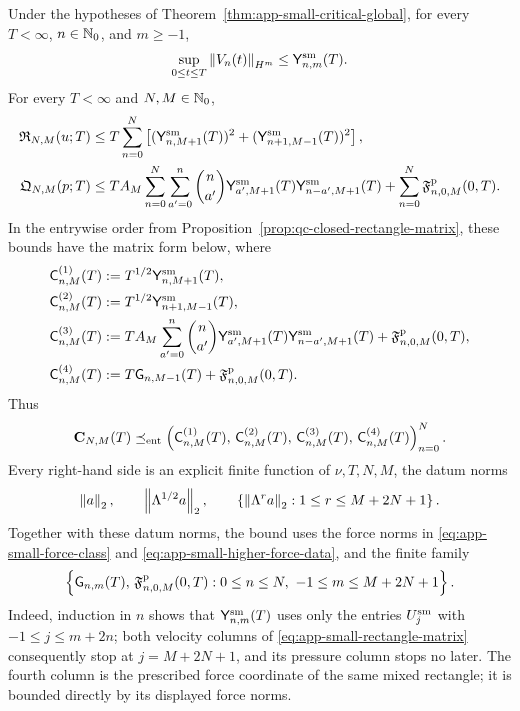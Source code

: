 \begin{proposition}
\label{prop:app-small-data-rectangles}
Under the hypotheses of Theorem~\ref{thm:app-small-critical-global}, for
every \(T<\infty\), \(n\in\mathbb N_0\), and \(m\ge-1\),
\begin{equation}
 \sup_{0\le t\le T}\left\lVert V_n(t)\right\rVert_{H^m}
 \le\mathsf Y_{n,m}^{\rm sm}(T).
 \label{eq:app-small-time-row}
\end{equation}
For every \(T<\infty\) and \(N,M\in\mathbb N_0\),
\begin{align}
 \mathfrak R_{N,M}(u;T)
 &\le
 T\sum_{n=0}^{N}
 \left[
 (\mathsf Y_{n,M+1}^{\rm sm}(T))^2
 +(\mathsf Y_{n+1,M-1}^{\rm sm}(T))^2
 \right],
 \label{eq:app-small-rectangle}\\
 \mathfrak Q_{N,M}(p;T)
 &\le
 TA_M\sum_{n=0}^{N}\sum_{a'=0}^{n}\binom n{a'}
 \mathsf Y_{a',M+1}^{\rm sm}(T)
 \mathsf Y_{n-a',M+1}^{\rm sm}(T)
 +\sum_{n=0}^{N}\mathfrak F^{\rm p}_{n,0,M}(0,T).
 \label{eq:app-small-pressure-rectangle}
\end{align}
In the entrywise order from
Proposition~\ref{prop:qc-closed-rectangle-matrix}, these bounds have the
matrix form below, where
\begin{align*}
 \mathsf C^{(1)}_{n,M}(T)
 &:=T^{1/2}\mathsf Y_{n,M+1}^{\rm sm}(T),\\
 \mathsf C^{(2)}_{n,M}(T)
 &:=T^{1/2}\mathsf Y_{n+1,M-1}^{\rm sm}(T),\\
 \mathsf C^{(3)}_{n,M}(T)
 &:=TA_M\sum_{a'=0}^{n}\binom n{a'}
    \mathsf Y_{a',M+1}^{\rm sm}(T)
    \mathsf Y_{n-a',M+1}^{\rm sm}(T)
    +\mathfrak F^{\rm p}_{n,0,M}(0,T),\\
 \mathsf C^{(4)}_{n,M}(T)
 &:=T\mathsf G_{n,M-1}(T)
    +\mathfrak F^{\rm p}_{n,0,M}(0,T).
\end{align*}
Thus
\begin{equation}
 \mathbf C_{N,M}(T)
 \preceq_{\rm ent}
 \left(
 \mathsf C^{(1)}_{n,M}(T),\,
 \mathsf C^{(2)}_{n,M}(T),\,
 \mathsf C^{(3)}_{n,M}(T),\,
 \mathsf C^{(4)}_{n,M}(T)
 \right)_{n=0}^{N}.
 \label{eq:app-small-rectangle-matrix}
\end{equation}
Every right-hand side is an explicit finite function of \(\nu,T,N,M\), the
datum norms
\begin{equation}
 \left\lVert a\right\rVert_2,\qquad
 \left\lVert \Lambda^{1/2}a\right\rVert_2,\qquad
 \left\{\left\lVert \Lambda^ra\right\rVert_2:
 1\le r\le M+2N+1\right\}.
 \label{eq:app-small-data-derivative-ceiling}
\end{equation}
Together with these datum norms, the bound uses
the force norms in \eqref{eq:app-small-force-class} and
\eqref{eq:app-small-higher-force-data}, and the finite family
\[
 \left\{\mathsf G_{n,m}(T),\,
 \mathfrak F^{\rm p}_{n,0,M}(0,T):
 0\le n\le N,\ -1\le m\le M+2N+1\right\}.
\]
Indeed, induction in \(n\) shows that
\(\mathsf Y_{n,m}^{\rm sm}(T)\) uses only the entries
\(U_j^{\rm sm}\) with \(-1\le j\le m+2n\); both velocity columns of
\eqref{eq:app-small-rectangle-matrix} consequently stop at
\(j=M+2N+1\), and its pressure column stops no later.
The fourth column is the prescribed force coordinate of the same mixed
rectangle; it is bounded directly by its displayed force norms.
\end{proposition}

